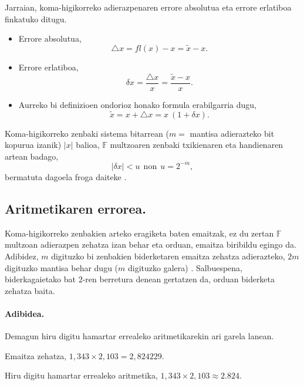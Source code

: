 Jarraian, koma-higikorreko adierazpenaren errore absolutua eta errore erlatiboa finkatuko ditugu.
\begin{itemize}
\item Errore absolutua,
\begin{equation*}
\triangle x= fl(x)-x= \tilde{x}-x. 
\end{equation*} 
\item Errore erlatiboa, 
\begin{equation*}
\delta x =\frac{\triangle x}{x} = \frac{\tilde{x}-x}{x}. 
\end{equation*}
\item Aurreko bi definizioen ondorioz honako formula erabilgarria dugu,
\begin{equation*}
\tilde{x}= x+\triangle x = x \ (1+\delta x).
\end{equation*}
\end{itemize}

Koma-higikorreko zenbaki sistema bitarrean ($m=$ mantisa adierazteko bit kopurua izanik) $|x|$ balioa, $\mathbb{F}$ multzoaren zenbaki txikienaren eta handienaren artean badago,
\begin{equation*}
 |\delta x|< u \ \ \text{non} \ \ u=2^{-m},
 \end{equation*}
bermatuta dagoela froga daiteke \cite{Corless2013}.

\subsection*{Aritmetikaren errorea.} 

Koma-higikorreko zenbakien arteko eragiketa baten emaitzak, ez du zertan $\mathbb{F}$ multzoan adierazpen zehatza izan behar eta orduan, emaitza biribildu egingo  da. Adibidez, $m$ digituzko bi zenbakien biderketaren emaitza zehatza adierazteko, $2m$ digituzko mantisa behar dugu ($m$ digituzko galera) \cite{Fukushima2001}. Salbuespena, biderkagaietako bat $2$-ren berretura denean gertatzen da, orduan biderketa zehatza baita.

\paragraph*{Adibidea.} Demagun hiru digitu hamartar errealeko aritmetikarekin ari garela lanean.

Emaitza zehatza, $1,343 \times 2,103 = 2,824229$. 

Hiru digitu hamartar errealeko aritmetika, $1,343 \times 2,103 \approx 2.824$.

